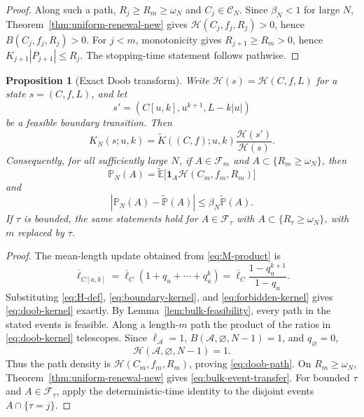 \documentclass[journal]{IEEEtran}
\theoremstyle{plain}
\newtheorem{proposition}[theorem]{Proposition}
\theoremstyle{definition}
\theoremstyle{remark}
\newcommand{\A}{\mathcal A}
\newcommand{\F}{\mathcal F}
\newcommand{\Pforb}{\widetilde{\mathbb P}}
\newcommand{\Pbound}{\mathbb P_N}
\newcommand{\Eforb}{\widetilde{\mathbb E}}
\newcommand{\lbar}{\overline\ell}
\newcommand{\one}{\mathbf 1}
\begin{document}
\begin{proof}
Along such a path, $R_j\ge R_m\ge\omega_N$ and $C_j\in\mathcal C_N$.  Since $\beta_N<1$ for large $N$, Theorem~\ref{thm:uniform-renewal-new} gives $\mathcal H(C_j,f_j,R_j)>0$, hence $B(C_j,f_j,R_j)>0$.  For $j<m$, monotonicity gives $R_{j+1}\ge R_m>0$, hence $K_{j+1}|P_{j+1}|\le R_j$.  The stopping-time statement follows pathwise.
\end{proof}

\begin{proposition}[Exact Doob transform]\label{prop:doob}
Write $\mathcal H(s)=\mathcal H(C,f,L)$ for a state $s=(C,f,L)$, and let
\begin{equation*}
 s'=(C[u,k],u^{k+1},L-k|u|)
\end{equation*}
be a feasible boundary transition.  Then
\begin{equation}\label{eq:doob-kernel}
 K_N(s;u,k)=\widetilde K((C,f);u,k)
 \frac{\mathcal H(s')}{\mathcal H(s)}.
\end{equation}
Consequently, for all sufficiently large $N$, if $A\in\F_m$ and $A\subset\{R_m\ge\omega_N\}$, then
\begin{equation}\label{eq:doob-path}
 \Pbound(A)=\Eforb\bigl[\one_A\mathcal H(C_m,f_m,R_m)\bigr]
\end{equation}
and
\begin{equation}\label{eq:bulk-event-transfer}
 |\Pbound(A)-\Pforb(A)|\le\beta_N\Pforb(A).
\end{equation}
If $\tau$ is bounded, the same statements hold for $A\in\F_\tau$ with $A\subset\{R_\tau\ge\omega_N\}$, with $m$ replaced by $\tau$.
\end{proposition}

\begin{proof}
The mean-length update obtained from \eqref{eq:M-product} is
\begin{equation}\label{eq:lbar-update}
 \lbar_{C[u,k]}=\lbar_C(1+q_u+\cdots+q_u^k)
 =\lbar_C\frac{1-q_u^{k+1}}{1-q_u}.
\end{equation}
Substituting \eqref{eq:H-def}, \eqref{eq:boundary-kernel}, and \eqref{eq:forbidden-kernel} gives \eqref{eq:doob-kernel} exactly.  By Lemma~\ref{lem:bulk-feasibility}, every path in the stated events is feasible.  Along a length-$m$ path the product of the ratios in \eqref{eq:doob-kernel} telescopes.  Since $\lbar_{\A}=1$, $B(\A,\varnothing,N-1)=1$, and $q_{\varnothing}=0$,
\begin{equation*}
 \mathcal H(\A,\varnothing,N-1)=1.
\end{equation*}
Thus the path density is $\mathcal H(C_m,f_m,R_m)$, proving \eqref{eq:doob-path}.  On $R_m\ge\omega_N$, Theorem~\ref{thm:uniform-renewal-new} gives \eqref{eq:bulk-event-transfer}.  For bounded $\tau$ and $A\in\F_\tau$, apply the deterministic-time identity to the disjoint events $A\cap\{\tau=j\}$.
\end{proof}
\end{document}
